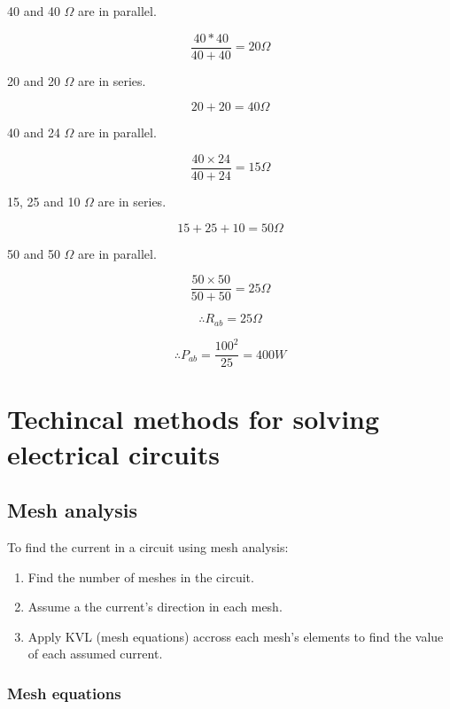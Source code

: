\documentclass[a4paper]{book}
\begin{document}
\begin{enumerate}
40 and 40 $\Omega$ are in parallel.

$$\frac{40 * 40}{40 + 40} = 20 \Omega$$

20 and 20 $\Omega$ are in series.

$$20 + 20 = 40 \Omega$$

40 and 24 $\Omega$ are in parallel.

$$\frac{40 \times 24}{40 + 24} = 15 \Omega$$

15, 25 and 10 $\Omega$ are in series.

$$15 + 25 + 10 = 50 \Omega$$

50 and 50 $\Omega$ are in parallel.

$$\frac{50 \times 50}{50 + 50} = 25 \Omega$$

$$\therefore R_{ab} = 25 \Omega$$

$$\therefore P_{ab} = \frac{100^2}{25} = 400W$$

\end{enumerate}

\section{Techincal methods for solving electrical circuits}

\subsection{Mesh analysis}

To find the current in a circuit using mesh analysis:

\begin{enumerate}

  \item Find the number of meshes in the circuit.
  \item Assume a the current's direction in each mesh.
  \item Apply KVL (mesh equations) accross each mesh's elements to find the value of each assumed current.

\end{enumerate}

\subsubsection{Mesh equations}
\end{document}
